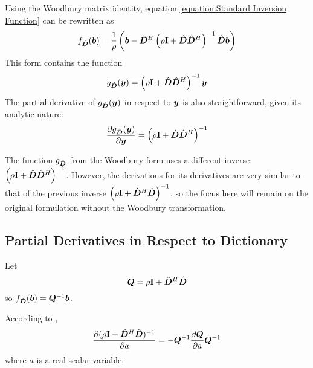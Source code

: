 \begin{appendices}
Using the Woodbury matrix identity, equation \ref{equation:Standard Inversion Function} can be rewritten as
\begin{equation}
f_{\hat{\bm{D}}}(\bm{b}) = \frac{1}{\rho}\left(\bm{b} - \hat{\bm{D}}^H\left(\rho{\bf I} + \hat{\bm{D}}\hat{\bm{D}}^H\right)^{-1}\hat{\bm{D}}\bm{b}\right) \label{equation:Woodbury Inversion Function}
\end{equation}
This form contains the function
\begin{equation}
g_{\hat{\bm{D}}}(\bm{y}) = \left(\rho{\bf I} + \hat{\bm{D}}\hat{\bm{D}}^H\right)^{-1}\bm{y}
\end{equation}
%
The partial derivative of $g_{\hat{\bm{D}}}(\bm{y})$ in respect to $\bm{y}$ is also straightforward, given its analytic nature:
\begin{equation}
\frac{\partial g_{\hat{\bm{D}}}(\bm{y})}{\partial \bm{y}} = \left(\rho{\bf I} + \hat{\bm{D}}\hat{\bm{D}}^H\right)^{-1}
\end{equation}

The function $g_{\hat{\bm{D}}}$ from the Woodbury form uses a different inverse: $\left(\rho{\bf I} + \hat{\bm{D}}\hat{\bm{D}}^H\right)^{-1}$. However, the derivations for its derivatives are very similar to that of the previous inverse $\left(\rho{\bf I} + \hat{\bm{D}}^H\hat{\bm{D}}\right)^{-1}$, so the focus here will remain on the original formulation without the Woodbury transformation.

\subsection{Partial Derivatives in Respect to Dictionary} \label{section:Differentiating Standard Form}
Let
%
\begin{equation}
\bm{Q} = \rho{\bf I} + \hat{\bm{D}}^H\hat{\bm{D}}
\end{equation}
%
so $f_{\hat{\bm{D}}}(\bm{b}) = \bm{Q}^{-1}\bm{b}$.

According to \cite{petersen2008matrix},
\begin{equation} \label{equation:Derivative of Inverse}
\frac{\partial (\rho{\bf I} + \hat{\bm{D}}^H\hat{\bm{D}})^{-1}}{\partial a} = -\bm{Q}^{-1}\frac{\partial \bm{Q}}{\partial a}\bm{Q}^{-1}
\end{equation}
where $a$ is a real scalar variable.


\end{appendices}
